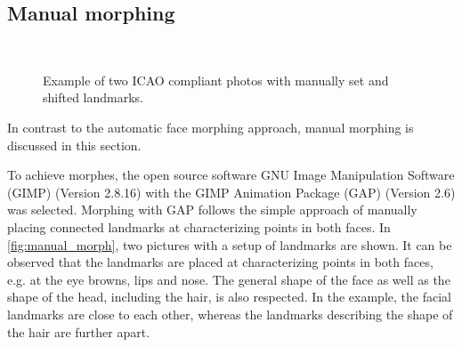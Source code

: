 \subsection{Manual morphing}
\label{manual_morph}
\begin{figure}[h]
	\centering
	\label{subfig:manualmorph01}\hspace{25pt}
	\label{subfig:manualmorph02}\\
	\caption{Example of two ICAO compliant photos with manually set and shifted landmarks.}
	\label{fig:manual_morph} 
\end{figure}
In contrast to the automatic face morphing approach, manual morphing is discussed in this section. 

To achieve morphes, the open source software GNU Image Manipulation Software (GIMP) (Version 2.8.16) with the GIMP Animation Package (GAP) (Version 2.6) was selected. Morphing with GAP follows the simple approach of manually placing connected landmarks at characterizing points in both faces. In \autoref{fig:manual_morph}, two pictures with a setup of landmarks are shown. It can be observed that the landmarks are placed at characterizing points in both faces, e.g. at the eye browns, lips and nose. The general shape of the face as well as the shape of the head, including the hair, is also respected. In the example, the facial landmarks are close to each other, whereas the landmarks describing the shape of the hair are further apart. 

